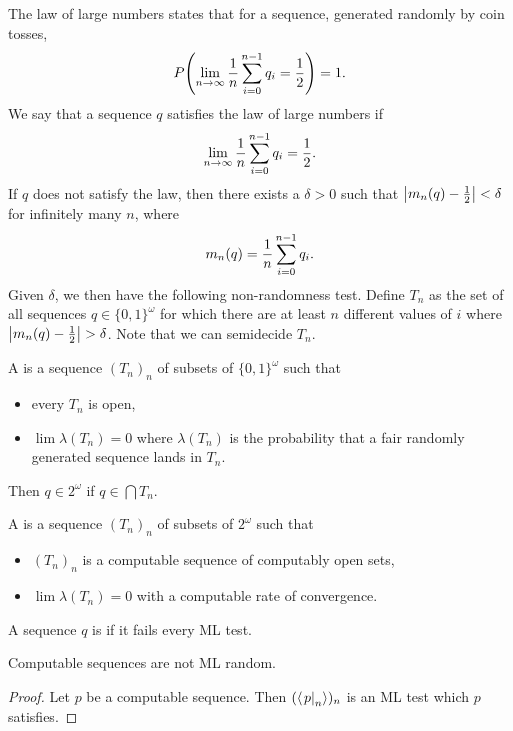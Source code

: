 
The law of large numbers states that for a sequence, generated randomly by coin
tosses,
\[
  P\!\left( \lim_{n \to \infty} \frac{1}{n} \sum_{i=0}^{n-1} q_i = \frac{1}{2} \right)
  = 1.
\]
We say that a sequence $q$ satisfies the law of large numbers if
\[
  \lim_{n \to \infty} \frac{1}{n} \sum_{i=0}^{n-1} q_i = \frac{1}{2}.
\]
If $q$ does not satisfy the law, then there exists a $\delta > 0$ such that
$\left| m_n(q) - \frac{1}{2} \right| < \delta$ for infinitely many $n$, where
\[
  m_n(q) = \frac{1}{n} \sum_{i=0}^{n-1} q_i.
\]
Given $\delta$, we then have the following non-randomness test.
Define $T_n$ as the set of all sequences $q \in \{0,1\}^\omega$ for which there
are at least $n$ different values of $i$ where $\left| m_n(q) - \frac{1}{2} \right| > \delta$.
Note that we can semidecide $T_n$.

\begin{definition}
  A  is a sequence $(T_n)_n$ of subsets of
  $\{0,1\}^\omega$ such that
  \begin{itemize}
  \item every $T_n$ is open,
  \item $\lim \lambda(T_n) = 0$ where $\lambda(T_n)$ is the probability that a
	fair randomly generated sequence lands in $T_n$.
  \end{itemize}
  Then $q \in 2^\omega$  if $q \in \bigcap T_n$.
\end{definition}

\begin{definition}
  A  is a sequence $(T_n)_n$ of subsets of
  $2^\omega$ such that
  \begin{itemize}
  \item $(T_n)_n$ is a computable sequence of computably open sets,
  \item $\lim \lambda(T_n) = 0$ with a computable rate of convergence.
  \end{itemize}
  A sequence $q$ is  if it fails every ML test.
\end{definition}

\begin{proposition}
  Computable sequences are not ML random.
\end{proposition}

\begin{proof}
  Let $p$ be a computable sequence.
  Then $(\left< \left. p \right|_n \right>)_n$ is an ML test which $p$ satisfies.
\end{proof}

